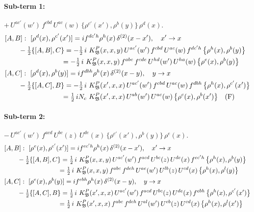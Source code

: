 \documentclass[10pt]{article}
\numberwithin{equation}{section}
\begin{document}
\paragraph{Sub-term 1:} $+\,U^{ac'}(w')\,f^{cbd}\,U^{ac}(w)\,\big\{\rho^{c'}(x'),\rho^{b}(y)\big\}\,\rho^{d}(x)$.
\begin{align}
&[A,B]:\ [\rho^{d}(x),\rho^{c'}(x')]=i f^{dc'h}\rho^{h}(x)\,\delta^{(2)}(x-x'),\quad x'\to x\notag\\
&\qquad -\tfrac12\{[A,B],C\}=-\tfrac12\,i\,\,K^{P}_{\mathfrak B}(x,x,y)\,U^{ac'}(w')\,f^{cbd}\,U^{ac}(w)\,f^{dc'h}\,\big\{\rho^{h}(x),\rho^{b}(y)\big\}\notag\\
&\qquad\phantom{-\tfrac12\{[A,B],C\}}=-\tfrac12\,i\,\,K^{P}_{\mathfrak B}(x,x,y)\,f^{abc}\,f^{cde}\,U^{hd}(w')\,U^{ha}(w)\,\big\{\rho^{e}(x),\rho^{b}(y)\big\}
\label{eq:GII.I1.P-1-AB}\\
&[A,C]:\ [\rho^{d}(x),\rho^{b}(y)]=i f^{dbh}\rho^{h}(x)\,\delta^{(2)}(x-y),\quad y\to x\notag\\
&\qquad -\tfrac12\{[A,C],B\}=-\tfrac12\,i\,\,K^{P}_{\mathfrak B}(x',x,x)\,U^{ac'}(w')\,f^{cbd}\,U^{ac}(w)\,f^{dbh}\,\big\{\rho^{h}(x),\rho^{c'}(x')\big\}\notag\\
&\qquad\phantom{-\tfrac12\{[A,C],B\}}=\tfrac12\,i N_{c}\,\,K^{P}_{\mathfrak B}(x',x,x)\,U^{ab}(w')\,U^{ac}(w)\,\big\{\rho^{c}(x),\rho^{b}(x')\big\}\quad\text{(F)}
\label{eq:GII.I1.P-1-AC}
\end{align}
\paragraph{Sub-term 2:} $-\,U^{ac'}(w')\,f^{acd}\,U^{bc}(z)\,U^{de}(x)\,\big\{\rho^{c'}(x'),\rho^{b}(y)\big\}\,\rho^{e}(x)$.
\begin{align}
&[A,B]:\ [\rho^{e}(x),\rho^{c'}(x')]=i f^{ec'h}\rho^{h}(x)\,\delta^{(2)}(x-x'),\quad x'\to x\notag\\
&\qquad -\tfrac12\{[A,B],C\}=\tfrac12\,i\,\,K^{P}_{\mathfrak B}(x,x,y)\,U^{ac'}(w')\,f^{acd}\,U^{bc}(z)\,U^{de}(x)\,f^{ec'h}\,\big\{\rho^{h}(x),\rho^{b}(y)\big\}\notag\\
&\qquad\phantom{-\tfrac12\{[A,B],C\}}=\tfrac12\,i\,\,K^{P}_{\mathfrak B}(x,x,y)\,f^{abc}\,f^{deh}\,U^{ae}(w')\,U^{lb}(z)\,U^{cd}(x)\,\big\{\rho^{h}(x),\rho^{l}(y)\big\}
\label{eq:GII.I1.P-2-AB}\\
&[A,C]:\ [\rho^{e}(x),\rho^{b}(y)]=i f^{ebh}\rho^{h}(x)\,\delta^{(2)}(x-y),\quad y\to x\notag\\
&\qquad -\tfrac12\{[A,C],B\}=\tfrac12\,i\,\,K^{P}_{\mathfrak B}(x',x,x)\,U^{ac'}(w')\,f^{acd}\,U^{bc}(z)\,U^{de}(x)\,f^{ebh}\,\big\{\rho^{h}(x),\rho^{c'}(x')\big\}\notag\\
&\qquad\phantom{-\tfrac12\{[A,C],B\}}=\tfrac12\,i\,\,K^{P}_{\mathfrak B}(x',x,x)\,f^{abc}\,f^{deh}\,U^{al}(w')\,U^{eb}(z)\,U^{cd}(x)\,\big\{\rho^{h}(x),\rho^{l}(x')\big\}
\label{eq:GII.I1.P-2-AC}
\end{align}
\end{document}

